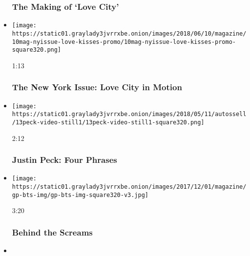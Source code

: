 \begin{itemize}
  \hypertarget{the-making-of-love-city-1}{%
  \subsubsection{The Making of `Love
  City'}\label{the-making-of-love-city-1}}
\item
  \href{https://www.nytimes3xbfgragh.onion/video/magazine/100000005939489/the-new-york-issue-love-city-in-motion.html?action=click\&module=video-series-bar\&region=header\&pgtype=Article\&playlistId=video/magazine}{}

  \texttt{[image: https://static01.graylady3jvrrxbe.onion/images/2018/06/10/magazine/10mag-nyissue-love-kisses-promo/10mag-nyissue-love-kisses-promo-square320.png]}

  1:13

  \hypertarget{the-new-york-issue-love-city-in-motion}{%
  \subsubsection{The New York Issue: Love City in
  Motion}\label{the-new-york-issue-love-city-in-motion}}
\item
  \href{https://www.nytimes3xbfgragh.onion/video/magazine/100000005893670/four-phrases-justin-peck-ballet-improvisations.html?action=click\&module=video-series-bar\&region=header\&pgtype=Article\&playlistId=video/magazine}{}

  \texttt{[image: https://static01.graylady3jvrrxbe.onion/images/2018/05/11/autossell/13peck-video-still1/13peck-video-still1-square320.png]}

  2:12

  \hypertarget{justin-peck-four-phrases}{%
  \subsubsection{Justin Peck: Four
  Phrases}\label{justin-peck-four-phrases}}
\item
  \href{https://www.nytimes3xbfgragh.onion/video/magazine/100000005593268/behind-the-screams.html?action=click\&module=video-series-bar\&region=header\&pgtype=Article\&playlistId=video/magazine}{}

  \texttt{[image: https://static01.graylady3jvrrxbe.onion/images/2017/12/01/magazine/gp-bts-img/gp-bts-img-square320-v3.jpg]}

  3:20

  \hypertarget{behind-the-screams}{%
  \subsubsection{Behind the Screams}\label{behind-the-screams}}
\item
  \href{https://www.nytimes3xbfgragh.onion/video/magazine/100000005588849/andy-serkis-the-demented-clown.html?action=click\&module=video-series-bar\&region=header\&pgtype=Article\&playlistId=video/magazine}{}


\end{itemize}

